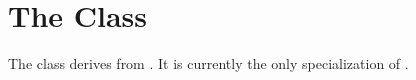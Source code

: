 

\section{The  Class}
\label{IntegralV3}

The  class derives from .
It is currently the only specialization of .